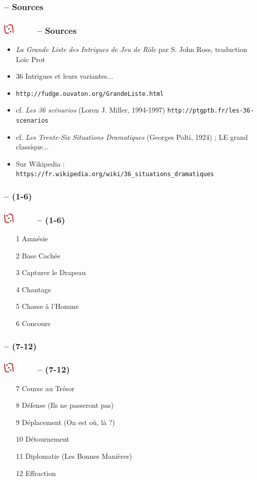 \documentclass[slidetop,11pt]{beamer}
\def\moreInFrameTitleLeftt{\includegraphics[height=0.5cm]{img/ligueludique-0.png}~~~~~}
\begin{document}
\subsubsection{\sectionPartIIbII  -- Sources}
\begin{frame}
	\frametitle{\moreInFrameTitleLeftt \sectionPartIIbII  -- Sources}
	\begin{itemize}
		\item \emph{La Grande Liste des Intrigues de Jeu de R{\^o}le} \newline
			par S. John Ross, traduction Lo{\"i}c Prot
		\item 36 Intrigues et leurs variantes...
		\item \texttt{http://fudge.ouvaton.org/GrandeListe.html}
		\item cf. \emph{Les 36 sc{\'e}narios} (Loren J. Miller, 1994-1997) \texttt{http://ptgptb.fr/les-36-scenarios}
		\item cf. \emph{Les Trente-Six Situations Dramatiques} (Georges Polti, 1924) ; LE grand classique...
		\item Sur Wikipedia : \texttt{https://fr.wikipedia.org/wiki/36\_situations\_dramatiques}
	\end{itemize}
\end{frame} 

\subsubsection{\sectionPartIIbII  -- (1-6)}
\begin{frame}
	\frametitle{\moreInFrameTitleLeftt \sectionPartIIbII  -- (1-6)}
	\begin{enumerate}
		\item[1] Amn{\'e}sie
		\item[2] Base Cach{\'e}e
		\item[3] Capturer le Drapeau
		\item[4] Chantage
		\item[5] Chasse {\`a} l'Homme
		\item[6] Concours
	\end{enumerate}
\end{frame} 

\subsubsection{\sectionPartIIbII  -- (7-12)}
\begin{frame}
	\frametitle{\moreInFrameTitleLeftt \sectionPartIIbII  -- (7-12)}
	\begin{enumerate}
		\item[7] Course au Tr{\'e}sor
		\item[8] D{\'e}fense (Ils ne passeront pas)
		\item[9] D{\'e}placement (On est o{\`u}, l{\`a} ?)
		\item[10] D{\'e}tournement
		\item[11] Diplomatie (Les Bonnes Mani{\`e}res)
		\item[12] Effraction
	\end{enumerate}
\end{frame} 
\end{document}
